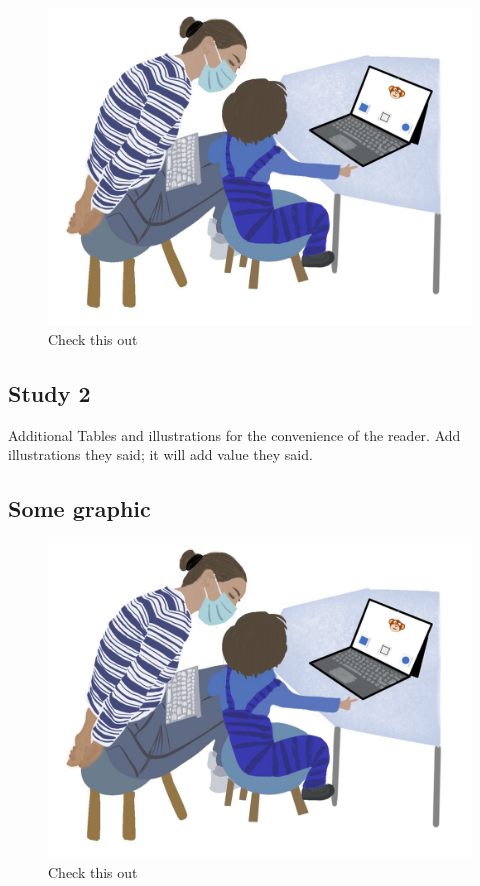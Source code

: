 \documentclass[
  man]{apa6}
\begin{document}
\begin{figure}

{\centering \includegraphics{../illustrations/Symlit_Rep_Setup_fromarrows} 

}

\caption{Check this out}\label{fig:suppl-setup3}
\end{figure}

\subsection{Study 2}\label{study-2-1}

Additional Tables and illustrations for the convenience of the reader. Add illustrations they said; it will add value they said.

\subsection{Some graphic}\label{some-graphic-1}

\begin{figure}

{\centering \includegraphics{../illustrations/Symlit_Rep_Setup_fromarrows} 

}

\caption{Check this out}\label{fig:suppl-setup4}
\end{figure}
\end{document}
